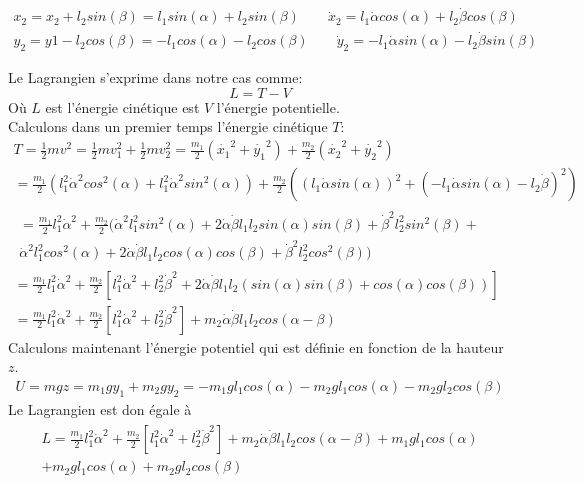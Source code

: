 \documentclass{article}
\begin{document}
\begin{align*}
    x_2=x_2+l_2 sin(\beta)= l_1 sin(\alpha)+l_2 sin(\beta)\quad \quad
    \dot{x}_2=l_1 \dot{\alpha} cos(\alpha)+l_2 \dot{\beta} cos(\beta)
    \\
    y_2=y1-l_2 cos(\beta)=-l_1 cos(\alpha)-l_2 cos(\beta) \quad \quad
    \dot{y}_2=-l_1 \dot{\alpha} sin(\alpha)-l_2 \dot{\beta} sin(\beta)
\end{align*}

Le Lagrangien s'exprime dans notre cas comme:
$$
L=T-V 
$$
Où $L$ est l'énergie cinétique est $V$ l'énergie potentielle. 
\\Calculons dans un premier temps l'énergie cinétique $T$:
\begin{gather*}
    T=\frac{1}{2}m v^2=\frac{1}{2}m v_1^2+\frac{1}{2}m v_2^2
    =\frac{m_1}{2}(\dot{x_1}^2+\dot{y_1}^2)+\frac{m_2}{2} (\dot{x_2}^2+\dot{y_2}^2) \\
    =\frac{m_1}{2}(l_1^2 \dot{\alpha}^2 cos^2(\alpha)+l_1^2\dot{\alpha}^2 sin^2(\alpha))+\frac{m_2}{2}((l_1 \dot{\alpha} sin(\alpha))^2 + (-l_1 \dot{\alpha} sin(\alpha)-l_2 \dot{\beta})^2)\\
    \begin{split}
        =\frac{m_1}{2}l_1^2 \dot{\alpha}^2+
        \frac{m_2}{2}(\dot{\alpha}^2l_1^2 sin^2 (\alpha)+2\dot{\alpha}\dot{\beta}l_1l_2sin(\alpha)sin(\beta)+\dot{\beta}^2l_2^2 sin^2 (\beta)+\\\dot{\alpha}^2l_1^2 cos^2 (\alpha)+2\dot{\alpha}\dot{\beta}l_1l_2cos(\alpha)cos(\beta)+\dot{\beta}^2l_2^2 cos^2 (\beta))
    \end{split}
    \\
    =\frac{m_1}{2}l_1^2\dot{\alpha}^2
    +\frac{m_2}{2}[l_1^2\dot{\alpha}^2+l_2^2\dot{\beta}^2
    +2\dot{\alpha}\dot{\beta}l_1l_2(sin(\alpha)sin(\beta)+cos(\alpha)cos(\beta))]
    \\
    =\boxed{\frac{m_1}{2}l_1^2\dot{\alpha}^2
    +\frac{m_2}{2}[l_1^2\dot{\alpha}^2+l_2^2\dot{\beta}^2]
    +m_2\dot{\alpha}\dot{\beta}l_1l_2cos(\alpha - \beta)}
\end{gather*}
Calculons maintenant l'énergie potentiel qui est définie en fonction de la hauteur $z$.
\begin{gather*}
    U=mgz=m_1 g y_1 + m_2 g y_2 =\boxed{ -m_1g l_1 cos(\alpha)-m_2 g l_1 cos(\alpha) - m_2 g l_2 cos(\beta)}
\end{gather*}
Le Lagrangien est don égale à
\begin{multline*}
    \boxed{
    \!\begin{aligned}
    L=\frac{m_1}{2}l_1^2\dot{\alpha}^2
    +\frac{m_2}{2}[l_1^2\dot{\alpha}^2+l_2^2\dot{\beta}^2]
    +m_2 \dot{\alpha}\dot{\beta}l_1l_2cos(\alpha - \beta)+
    m_1g l_1 cos(\alpha)\\+m_2 g l_1 cos(\alpha)+m_2 g l_2 cos(\beta)
    \end{aligned}
    }
\end{multline*}
\end{document}
